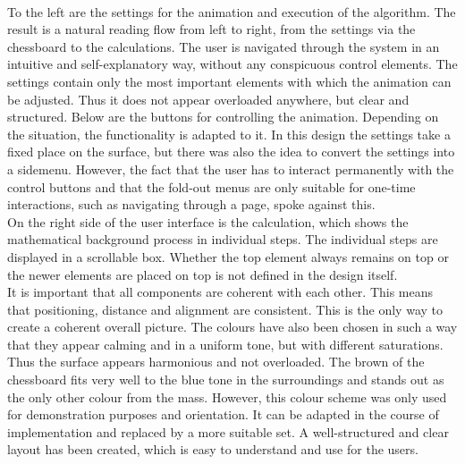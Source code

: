 \\
To the left are the settings for the animation and execution of the algorithm. The result is a natural reading flow from left to right, from the settings via the chessboard to the calculations. The user is navigated through the system in an intuitive and self-explanatory way, without any conspicuous control elements. The settings contain only the most important elements with which the animation can be adjusted. Thus it does not appear overloaded anywhere, but clear and structured. Below are the buttons for controlling the animation. Depending on the situation, the functionality is adapted to it. In this design the settings take a fixed place on the surface, but there was also the idea to convert the settings into a sidemenu. However, the fact that the user has to interact permanently with the control buttons and that the fold-out menus are only suitable for one-time interactions, such as navigating through a page, spoke against this. 
\\
On the right side of the user interface is the calculation, which shows the mathematical background process in individual steps. The individual steps are displayed in a scrollable box. Whether the top element always remains on top or the newer elements are placed on top is not defined in the design itself.
\\
It is important that all components are coherent with each other. This means that positioning, distance and alignment are consistent. This is the only way to create a coherent overall picture. The colours have also been chosen in such a way that they appear calming and in a uniform tone, but with different saturations. Thus the surface appears harmonious and not overloaded. The brown of the chessboard fits very well to the blue tone in the surroundings and stands out as the only other colour from the mass. However, this colour scheme was only used for demonstration purposes and orientation. It can be adapted in the course of implementation and replaced by a more suitable set. A well-structured and clear layout has been created, which is easy to understand and use for the users.